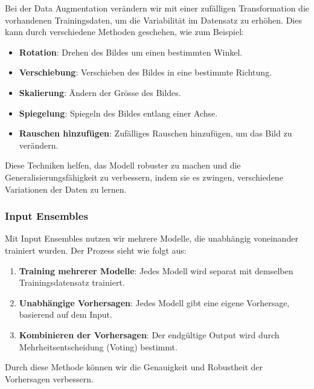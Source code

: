 
Bei der Data Augmentation verändern wir mit einer zufälligen Transformation die vorhandenen Trainingsdaten, um die Variabilität im Datensatz zu erhöhen. Dies kann durch verschiedene Methoden geschehen, wie zum Beispiel:

\begin{itemize}
    \item \textbf{Rotation}: Drehen des Bildes um einen bestimmten Winkel.
    \item \textbf{Verschiebung}: Verschieben des Bildes in eine bestimmte Richtung.
    \item \textbf{Skalierung}: Ändern der Grösse des Bildes.
    \item \textbf{Spiegelung}: Spiegeln des Bildes entlang einer Achse.
    \item \textbf{Rauschen hinzufügen}: Zufälliges Rauschen hinzufügen, um das Bild zu verändern.
\end{itemize}

Diese Techniken helfen, das Modell robuster zu machen und die Generalisierungsfähigkeit zu verbessern, indem sie es zwingen, verschiedene Variationen der Daten zu lernen.

\subsubsection{Input Ensembles}


Mit Input Ensembles nutzen wir mehrere Modelle, die unabhängig voneinander trainiert wurden. Der Prozess sieht wie folgt aus:

\begin{enumerate}
    \item \textbf{Training mehrerer Modelle}: Jedes Modell wird separat mit demselben Trainingsdatensatz trainiert.
    \item \textbf{Unabhängige Vorhersagen}: Jedes Modell gibt eine eigene Vorhersage, basierend auf dem Input.
    \item \textbf{Kombinieren der Vorhersagen}: Der endgültige Output wird durch Mehrheitsentscheidung (Voting) bestimmt. 
\end{enumerate}

Durch diese Methode können wir die Genauigkeit und Robustheit der Vorhersagen verbessern.